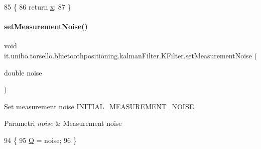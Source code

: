 \begin{DoxyCode}
85                                      \{
86         \textcolor{keywordflow}{return} \hyperlink{classit_1_1unibo_1_1torsello_1_1bluetoothpositioning_1_1kalmanFilter_1_1KFilter_aa6f9d5594f6870767679dbb79e40918d_aa6f9d5594f6870767679dbb79e40918d}{x};
87     \}
\end{DoxyCode}
\hypertarget{classit_1_1unibo_1_1torsello_1_1bluetoothpositioning_1_1kalmanFilter_1_1KFilter_a0ed62a630ff52aacdcd8832b9416f406_a0ed62a630ff52aacdcd8832b9416f406}{}\label{classit_1_1unibo_1_1torsello_1_1bluetoothpositioning_1_1kalmanFilter_1_1KFilter_a0ed62a630ff52aacdcd8832b9416f406_a0ed62a630ff52aacdcd8832b9416f406} 
\paragraph{\texorpdfstring{set\+Measurement\+Noise()}{setMeasurementNoise()}}
{\footnotesize\ttfamily void it.\+unibo.\+torsello.\+bluetoothpositioning.\+kalman\+Filter.\+K\+Filter.\+set\+Measurement\+Noise (\begin{DoxyParamCaption}\item[{double}]{noise }\end{DoxyParamCaption})}

Set measurement noise I\+N\+I\+T\+I\+A\+L\+\_\+\+M\+E\+A\+S\+U\+R\+E\+M\+E\+N\+T\+\_\+\+N\+O\+I\+SE


\begin{DoxyParams}{Parametri}
{\em noise} & Measurement noise \\
\hline
\end{DoxyParams}

\begin{DoxyCode}
94                                                   \{
95         \hyperlink{classit_1_1unibo_1_1torsello_1_1bluetoothpositioning_1_1kalmanFilter_1_1KFilter_a454b23b79e09bb12edbc9175e6ba17e9_a454b23b79e09bb12edbc9175e6ba17e9}{Q} = noise;
96     \}
\end{DoxyCode}
\hypertarget{classit_1_1unibo_1_1torsello_1_1bluetoothpositioning_1_1kalmanFilter_1_1KFilter_a7651339cfddb4cdaa1e47906b27745fc_a7651339cfddb4cdaa1e47906b27745fc}{}\label{classit_1_1unibo_1_1torsello_1_1bluetoothpositioning_1_1kalmanFilter_1_1KFilter_a7651339cfddb4cdaa1e47906b27745fc_a7651339cfddb4cdaa1e47906b27745fc} 
